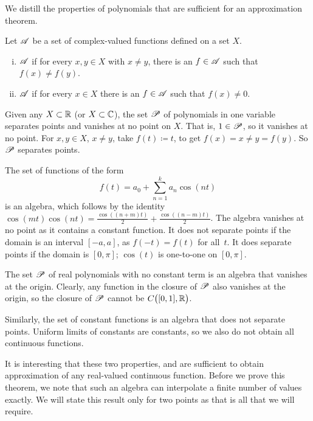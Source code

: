 We distill the properties of polynomials that are sufficient
for an approximation theorem.

\begin{defn}
Let ${\mathscr{A}}$ be a set of complex-valued functions defined on a set $X$.
\begin{enumerate}[(i)]
\item ${\mathscr{A}}$ \emph{}
if for every $x,y \in X$ with $x \neq y$, there is an $f \in {\mathscr{A}}$ such that
$f(x) \neq f(y)$.
\item 
${\mathscr{A}}$ \emph{} if for every $x \in X$
there is an $f \in {\mathscr{A}}$ such that $f(x) \neq 0$.
\end{enumerate}
\end{defn}

\begin{example}
Given any $X \subset {\mathbb{R}}$ (or $X \subset {\mathbb{C}}$),
the set ${\mathscr{P}}$ of polynomials in one variable separates points and vanishes at no point
on $X$.  That is, $1 \in {\mathscr{P}}$, so it vanishes at no point.
For $x,y \in X$, $x \neq y$, take $f(t) \coloneqq t$, to get $f(x) = x \neq y = f(y)$.
So ${\mathscr{P}}$ separates points.
\end{example}

\begin{example}
The set of functions of the form
\begin{equation*}
f(t) = a_0 + \sum_{n=1}^k a_n \cos(nt)
\end{equation*}
is an algebra,
which follows by the identity $\cos(mt)\cos(nt) = 
\frac{\cos((n+m) t)}{2}+
\frac{\cos((n-m) t)}{2}$.
The algebra vanishes at no point as it contains a constant function.
It does not separate points if the domain is an interval
$[-a,a]$, as $f(-t) = f(t)$ for all~$t$.
It does separate points if the domain is $[0,\pi]$; $\cos(t)$
is one-to-one on $[0,\pi]$.
\end{example}

\begin{example}
The set ${\mathscr{P}}$ of real polynomials with no constant term is an algebra that vanishes at the origin.
Clearly, any function in the closure of ${\mathscr{P}}$ also vanishes at the origin,
so the closure of ${\mathscr{P}}$ cannot be $C\bigl([0,1],{\mathbb{R}}\bigr)$.

Similarly, the set of constant functions is an algebra that does not
separate points.  Uniform limits of constants are constants, so we also do
not obtain all continuous functions.
\end{example}

It is interesting that these two properties,
 and
 are sufficient to obtain approximation of any
real-valued continuous function.
Before we prove this theorem, we note that such an algebra can interpolate
a finite number of values exactly.  We will state this result
only for two points as that is all that we will require.

